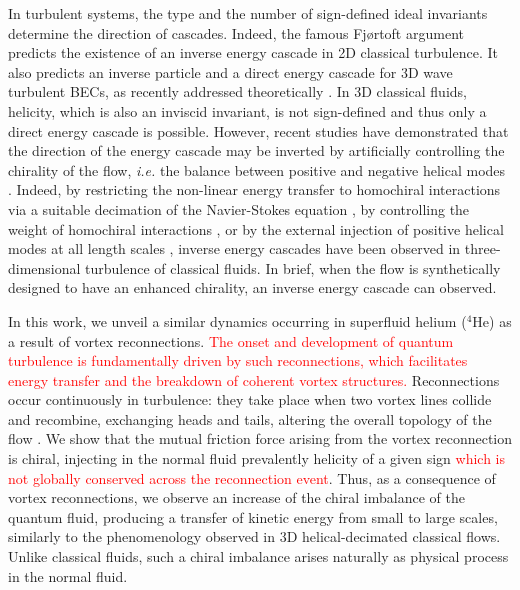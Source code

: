 \documentclass[%
 reprint,
 amsmath,amssymb,
 aps,
 prl,
]{revtex4-2}
\def\red#1{\textcolor{red}{#1}}
\begin{document}
{In turbulent systems, the type and the number of sign-defined ideal invariants determine the direction of cascades. Indeed, the famous 
Fjørtoft argument \cite{fjortoft1953changes} predicts 
the existence of an inverse energy cascade
in 2D classical turbulence. 
It also predicts an inverse particle and a direct energy cascade 
for 3D wave turbulent BECs, as recently addressed theoretically \cite{Zhu_DirectInverseCascades_2023}. In 3D classical fluids, helicity, which is also an inviscid invariant, is not sign-defined and thus only a direct energy cascade is possible. However, recent studies have demonstrated that the direction of the energy 
cascade may be inverted by artificially controlling the chirality of the 
flow, \textit{i.e.} the balance between positive and negative helical 
modes \cite{moffatt1969}.
Indeed, by restricting the non-linear energy transfer to homochiral 
interactions via a suitable decimation of the Navier-Stokes equation 
\cite{biferaleInverseEnergyCascade2012a,biferale-etal-2013}, by
controlling the weight of homochiral interactions \cite{sahoo-etal-2017},
or by the external injection 
of positive helical modes at all length scales 
\cite{plunianInverseCascadeEnergy2020a}, inverse energy cascades 
have been observed in three-dimensional turbulence of classical fluids. 
In brief, when the flow is synthetically designed to have an 
enhanced chirality, an inverse energy cascade can observed.


In this work, we unveil a similar dynamics occurring in superfluid helium
($^4$He) as a result of vortex reconnections. \red{The onset and development of quantum turbulence is fundamentally driven by such reconnections, which facilitates energy transfer and the breakdown of coherent vortex structures.}  
Reconnections occur continuously in turbulence: they take place when
two vortex lines collide and recombine, exchanging heads and tails, 
altering the overall topology of the flow
\cite{koplik-levine-1993,bewley-etal-2008,rorai-etal-2016,serafini-etal-2017,galantucci-baggaley-parker-barenghi-2019,villoisUniversalNonuniversalAspects2017,villois2020irreversible}. 
We show that the mutual friction force arising from the  
vortex reconnection is chiral, injecting in the normal fluid prevalently 
helicity of a given sign \red{which is not globally conserved across the reconnection event}. Thus, as a consequence of vortex reconnections,
we observe an increase of the chiral imbalance of the quantum fluid, producing a transfer of kinetic energy from small to large scales, similarly to the phenomenology observed in 3D helical-decimated classical flows. 
 Unlike classical fluids, such a chiral imbalance arises naturally as physical process in the normal fluid.%

}
\end{document}

